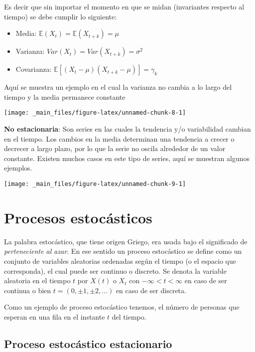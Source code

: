 \documentclass[
  a4paper,
  oneside,
  openany]{book}
\providecommand{\tightlist}{%
  \setlength{\itemsep}{0pt}\setlength{\parskip}{0pt}}
\begin{document}
Es decir que sin importar el momento en que se midan (invariantes respecto al tiempo) se debe cumplir lo siguiente:

\begin{itemize}
\tightlist
\item
  Media: \(\mathbb{E}(X_t) = \mathbb{E}(X_{t+k}) = \mu\)
\item
  Varianza: \(Var(X_t) = Var(X_{t+k}) = \sigma^2\)
\item
  Covarianza: \(\mathbb{E}[(X_t-\mu)(X_{t+k}-\mu)] = \gamma_k\)
\end{itemize}

Aquí se muestra un ejemplo en el cual la varianza no cambia a lo largo del tiempo y la media permanece constante

\begin{center}\texttt{[image: \_main\_files/figure-latex/unnamed-chunk-8-1]} \end{center}

\textbf{No estacionaria}: Son series en las cuales la tendencia y/o variabilidad cambian en el tiempo. Los cambios en la media determinan una tendencia a crecer o decrecer a largo plazo, por lo que la serie no oscila alrededor de un valor constante. Existen muchos casos en este tipo de series, aquí se muestran algunos ejemplos.

\begin{center}\texttt{[image: \_main\_files/figure-latex/unnamed-chunk-9-1]} \end{center}

\hypertarget{procesos-estocuxe1sticos}{%
\chapter{Procesos estocásticos}\label{procesos-estocuxe1sticos}}

La palabra estocástico, que tiene origen Griego, era usada bajo el significado de \emph{perteneciente al azar}. En ese sentido un proceso estocástico se define como un conjunto de variables aleatorias ordenadas según el tiempo (o el espacio que corresponda), el cual puede ser continuo o discreto.
Se denota la variable aleatoria en el tiempo \(t\) por \(X(t)\) o \(X_t\) con \(-\infty < t < \infty\) en caso de ser continua o bien \(t = (0, \pm1, \pm2, ... )\) en caso de ser discreta.

Como un ejemplo de proceso estocástico tenemos, el número de personas que esperan en una fila en el instante \(t\) del tiempo.

\hypertarget{proceso-estocuxe1stico-estacionario}{%
\section{Proceso estocástico estacionario}\label{proceso-estocuxe1stico-estacionario}}
\end{document}
